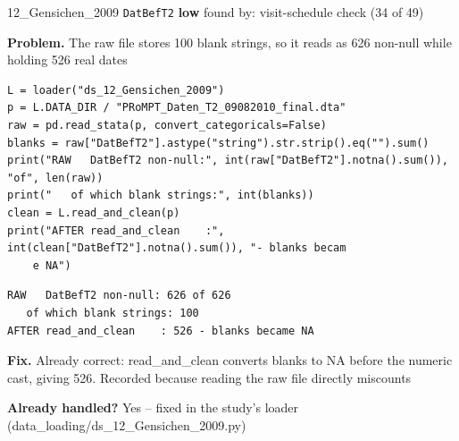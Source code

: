 \documentclass[9pt, t, handout]{beamer}
\newcommand{\ans}[1]{\textcolor{structure.fg}{#1}}
\begin{document}
\begin{frame}[fragile]{12\_Gensichen\_2009 \quad \texttt{DatBefT2}}
  {\scriptsize\textcolor{black!55}{\textbf{low}} \quad
   found by: visit-schedule check \quad (34 of 49)}
  \vspace{3pt}

  {\footnotesize \textbf{Problem.} The raw file stores 100 blank strings, so it reads as 626 non-null while holding 526 real dates}
  \vspace{4pt}

  \begin{Verbatim}[fontsize=\tiny, frame=single, framesep=2pt, label=\tiny reproduce]
L = loader("ds_12_Gensichen_2009")
p = L.DATA_DIR / "PRoMPT_Daten_T2_09082010_final.dta"
raw = pd.read_stata(p, convert_categoricals=False)
blanks = raw["DatBefT2"].astype("string").str.strip().eq("").sum()
print("RAW   DatBefT2 non-null:", int(raw["DatBefT2"].notna().sum()), "of", len(raw))
print("   of which blank strings:", int(blanks))
clean = L.read_and_clean(p)
print("AFTER read_and_clean    :", int(clean["DatBefT2"].notna().sum()), "- blanks becam
    e NA")
  \end{Verbatim}
  \begin{Verbatim}[fontsize=\tiny, frame=single, framesep=2pt, label=\tiny output]
RAW   DatBefT2 non-null: 626 of 626
   of which blank strings: 100
AFTER read_and_clean    : 526 - blanks became NA
  \end{Verbatim}
  \vspace{2pt}

  {\footnotesize \textbf{Fix.} Already correct: read\_and\_clean converts blanks to NA before the numeric cast, giving 526. Recorded because reading the raw file directly miscounts}
  \vspace{2pt}

  {\footnotesize \textbf{Already handled?} \ans{Yes} -- fixed in the study's loader
   (data\_loading/ds\_12\_Gensichen\_2009.py)}
\end{frame}
\end{document}

